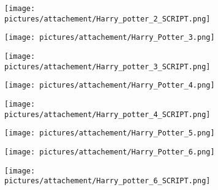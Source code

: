 \begin{figure} \ContinuedFloat
        \centering
        \begin{subfigure}{.49\textwidth}
                \centering
                \texttt{[image: pictures/attachement/Harry\_potter\_2\_SCRIPT.png]}
        \end{subfigure}
        \begin{subfigure}{.49\textwidth}
                \centering
                \texttt{[image: pictures/attachement/Harry\_Potter\_3.png]}
        \end{subfigure}
\end{figure}
\begin{figure} \ContinuedFloat
        \centering
        \begin{subfigure}{.49\textwidth}
                \centering
                \texttt{[image: pictures/attachement/Harry\_potter\_3\_SCRIPT.png]}
        \end{subfigure}
        \begin{subfigure}{.49\textwidth}
                \centering
                \texttt{[image: pictures/attachement/Harry\_Potter\_4.png]}
        \end{subfigure}
\end{figure}
\begin{figure} \ContinuedFloat
        \centering
        \begin{subfigure}{.49\textwidth}
                \centering
                \texttt{[image: pictures/attachement/Harry\_potter\_4\_SCRIPT.png]}
        \end{subfigure}
        \begin{subfigure}{.49\textwidth}
                \centering
                \texttt{[image: pictures/attachement/Harry\_Potter\_5.png]}
        \end{subfigure}
\end{figure}
\begin{figure} \ContinuedFloat
        \centering
        \begin{subfigure}{.49\textwidth}
                \centering
                \texttt{[image: pictures/attachement/Harry\_Potter\_6.png]}
        \end{subfigure}
        \begin{subfigure}{.49\textwidth}
                \centering
                \texttt{[image: pictures/attachement/Harry\_potter\_6\_SCRIPT.png]}
        \end{subfigure}
\end{figure}
